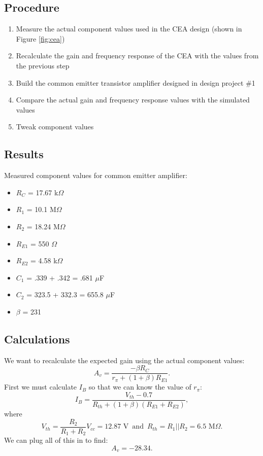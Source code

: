\documentclass[12pt,letterpaper]{report}
\begin{document}
\subsection*{Procedure}

\begin{enumerate}
\item Measure the actual component values used in the CEA design (shown in Figure \ref{fig:cea})
\item Recalculate the gain and frequency response of the CEA with the values from the previous step
\item Build the common emitter transistor amplifier designed in design project \#1
\item Compare the actual gain and frequency response values with the simulated values
\item Tweak component values 
\end{enumerate}

\subsection*{Results}

Measured component values for common emitter amplifier:
\begin{itemize}
\item $R_C$ = 17.67 k$\Omega$
\item $R_1$ = 10.1 M$\Omega$
\item $R_2$ = 18.24 M$\Omega$
\item $R_{E1}$ = 550 $\Omega$
\item $R_{E2}$ = 4.58 k$\Omega$
\item $C_1$ = .339 + .342 = .681 $\mu$F
\item $C_2$ = 323.5 + 332.3 = 655.8 $\mu$F
\item $\beta$ = 231
\end{itemize}



\subsection*{Calculations}

We want to recalculate the expected gain using the actual component values:
$$
A_v = \frac{-\beta R_C}{r_{\pi}+(1+\beta)R_{E1}}.
$$
First we must calculate $I_B$ so that we can know the value of $r_{\pi}$:
$$
I_B = \frac{V_{th}-0.7}{R_{th}+(1+\beta)(R_{E1}+R_{E2})},
$$
where
$$
V_{th} = \frac{R_2}{R_1+R_2}V_{cc} = 12.87 \text{ V}\, \text{ and } \, 
R_{th} = R_1||R_2 = 6.5 \text{ M}\Omega.
$$
We can plug all of this in to find:
$$
A_v = -28.34.
$$
\end{document}
